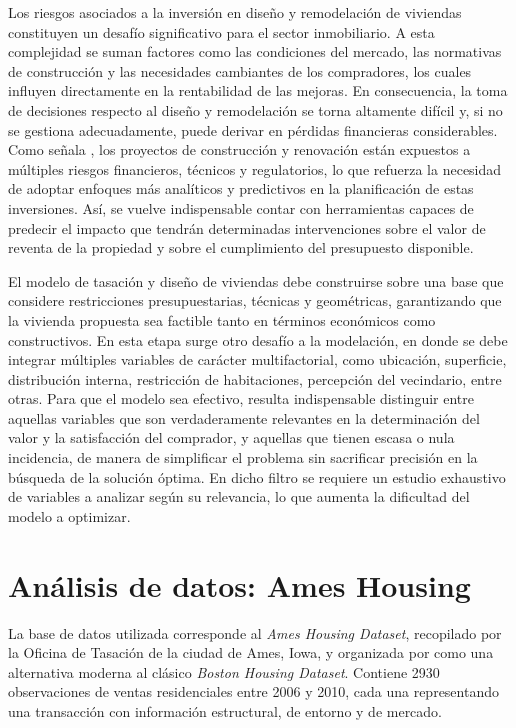 Los riesgos asociados a la inversión en diseño y remodelación de viviendas constituyen un desafío significativo para el sector inmobiliario. A esta complejidad se suman factores como las condiciones del mercado, las normativas de construcción y las necesidades cambiantes de los compradores, los cuales influyen directamente en la rentabilidad de las mejoras. En consecuencia, la toma de decisiones respecto al diseño y remodelación se torna altamente difícil y, si no se gestiona adecuadamente, puede derivar en pérdidas financieras considerables. Como señala , los proyectos de construcción y renovación están expuestos a múltiples riesgos financieros, técnicos y regulatorios, lo que refuerza la necesidad de adoptar enfoques más analíticos y predictivos en la planificación de estas inversiones. Así, se vuelve indispensable contar con herramientas capaces de predecir el impacto que tendrán determinadas intervenciones sobre el valor de reventa de la propiedad y sobre el cumplimiento del presupuesto disponible.

El modelo de tasación y diseño de viviendas debe construirse sobre una base que considere restricciones presupuestarias, técnicas y geométricas, garantizando que la vivienda propuesta sea factible tanto en términos económicos como constructivos. En esta etapa surge otro desafío a la modelación, en donde se debe integrar múltiples variables de carácter multifactorial, como ubicación, superficie, distribución interna, restricción de habitaciones, percepción del vecindario, entre otras. Para que el modelo sea efectivo, resulta indispensable distinguir entre aquellas variables que son verdaderamente relevantes en la determinación del valor y la satisfacción del comprador, y aquellas que tienen escasa o nula incidencia, de manera de simplificar el problema sin sacrificar precisión en la búsqueda de la solución óptima. En dicho filtro se requiere un estudio exhaustivo de variables a analizar según su relevancia, lo que aumenta la dificultad del modelo a optimizar.



\section{Análisis de datos: Ames Housing \label{sec:sec2}}
La base de datos utilizada corresponde al \textit{Ames Housing Dataset}, recopilado por la Oficina de Tasación de la ciudad de Ames, Iowa, y organizada por  como una alternativa moderna al clásico \textit{Boston Housing Dataset}. Contiene 2930 observaciones de ventas residenciales entre 2006 y 2010, cada una representando una transacción con información estructural, de entorno y de mercado.  

